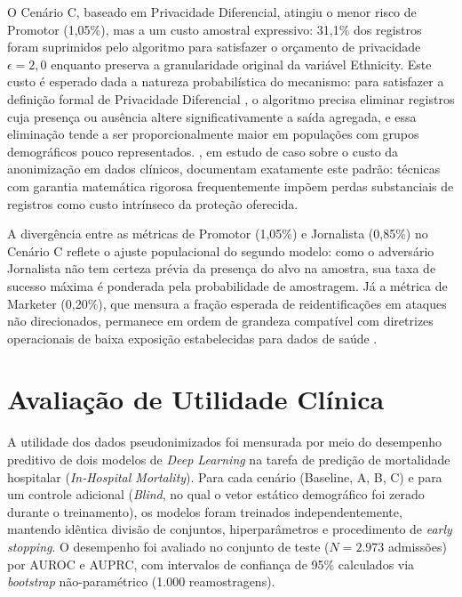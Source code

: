 O Cenário C, baseado em Privacidade Diferencial, atingiu o menor risco de Promotor (1,05\%), mas a um custo amostral expressivo: 31,1\% dos registros foram suprimidos pelo algoritmo para satisfazer o orçamento de privacidade $\epsilon = 2{,}0$ enquanto preserva a granularidade original da variável Ethnicity. Este custo é esperado dada a natureza probabilística do mecanismo: para satisfazer a definição formal de Privacidade Diferencial \cite{Dwork2006}, o algoritmo precisa eliminar registros cuja presença ou ausência altere significativamente a saída agregada, e essa eliminação tende a ser proporcionalmente maior em populações com grupos demográficos pouco representados. , em estudo de caso sobre o custo da anonimização em dados clínicos, documentam exatamente este padrão: técnicas com garantia matemática rigorosa frequentemente impõem perdas substanciais de registros como custo intrínseco da proteção oferecida.

A divergência entre as métricas de Promotor (1,05\%) e Jornalista (0,85\%) no Cenário C reflete o ajuste populacional do segundo modelo: como o adversário Jornalista não tem certeza prévia da presença do alvo na amostra, sua taxa de sucesso máxima é ponderada pela probabilidade de amostragem. Já a métrica de Marketer (0,20\%), que mensura a fração esperada de reidentificações em ataques não direcionados, permanece em ordem de grandeza compatível com diretrizes operacionais de baixa exposição estabelecidas para dados de saúde \cite{ElEmam2013}.

\section{Avaliação de Utilidade Clínica}
\label{sec:resultados-utilidade}

A utilidade dos dados pseudonimizados foi mensurada por meio do desempenho preditivo de dois modelos de \textit{Deep Learning} na tarefa de predição de mortalidade hospitalar (\textit{In-Hospital Mortality}). Para cada cenário (Baseline, A, B, C) e para um controle adicional (\textit{Blind}, no qual o vetor estático demográfico foi zerado durante o treinamento), os modelos foram treinados independentemente, mantendo idêntica divisão de conjuntos, hiperparâmetros e procedimento de \textit{early stopping}. O desempenho foi avaliado no conjunto de teste ($N = 2.973$ admissões) por AUROC e AUPRC, com intervalos de confiança de 95\% calculados via \textit{bootstrap} não-paramétrico (1.000 reamostragens).

